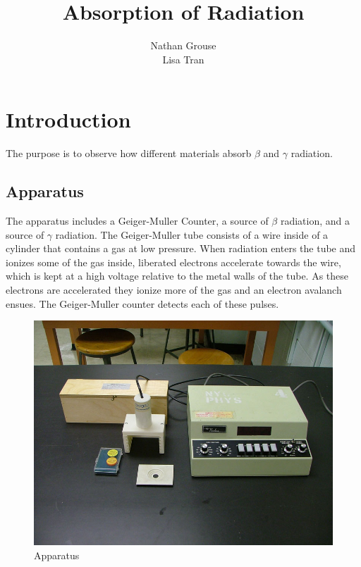 \documentclass[12pt]{article}
\title{Absorption of Radiation}
\author{Nathan Grouse\\Lisa Tran}
\begin{document}
\maketitle

\section{Introduction}
\indent \indent The purpose is to observe how different materials absorb $\beta$ and $\gamma$ radiation.

\subsection{Apparatus}
\indent \indent The apparatus includes a Geiger-Muller Counter, a source of $\beta$ radiation, and a source of $\gamma$ radiation. The Geiger-Muller tube consists of a wire inside of a cylinder that contains a gas at low pressure. When radiation enters the tube and ionizes some of the gas inside, liberated electrons accelerate towards the wire, which is kept at a high voltage relative to the metal walls of the tube. As these electrons are accelerated they ionize more of the gas and an electron avalanch ensues. The Geiger-Muller counter detects each of these pulses.

\begin{figure}[H]
\centering
\hspace{-0.0in}\includegraphics[scale=0.40]{apparatus.png}
\caption{Apparatus \label{fig:setup}}
\end{figure}
\end{document}
